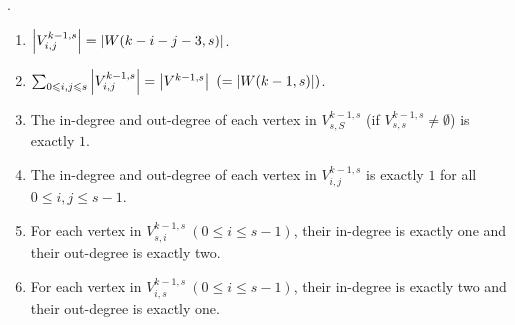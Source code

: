 \begin{lemma}\label{lem_prop_of_V_ks_ij}
    {\color{white}.}
    
    
    \begin{enumerate}
        \item $\left \lvert  V^{k-1,s}_{i,j} \right \rvert = \left \lvert  W(k-i-j-3,s) \right \rvert $.
        \item $\sum_{0\leqslant i,j\leqslant s}\left \lvert  V^{k-1,s}_{i,j} \right \rvert = \left \lvert  V^{k-1,s} \right \rvert\ (= \left \lvert  W(k-1,s) \right \rvert)$.
        \item The in-degree and out-degree of each vertex in $V^{k-1,s}_{s,S}$ (if $V^{k-1,s}_{s,s}\neq\emptyset$) is exactly $1$.
        \item The in-degree and out-degree of each vertex in $V^{k-1,s}_{i,j}$ is exactly $1$ for all $0\leq i,j\leq s-1$.
        \item For each vertex in $V^{k-1,s}_{s,i}\ (0\leq i\leq s-1)$, their in-degree is exactly one and their out-degree is exactly two.
        \item For each vertex in $V^{k-1,s}_{i,s}\ (0\leq i\leq s-1)$, their in-degree is exactly two and their out-degree is exactly one.
    \end{enumerate}
\end{lemma}
